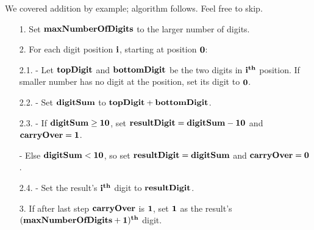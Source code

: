 \begin{frame}
We covered addition by example; algorithm follows. Feel free to skip.
\begin{algorithm}
\begin{itemize}
\item[1.] Set $\bf maxNumberOfDigits$ to the larger number of digits.
\item[2.] For each digit position $\bf{i}$, starting at position $\bf 0$:
\item[2.1.] - Let $\bf{topDigit}$ and $\bf{bottomDigit}$ be the two digits in $\bf{i}^{th}$ position. If smaller number has no digit at the position,  set its digit to $\bf 0$.
\item[2.2.] - Set $\bf{digitSum}$ to $\bf{topDigit} + \bf{bottomDigit}$.
\item[2.3.] 
- If $\bf{digitSum} \geq 10$, set $\bf{resultDigit}=\bf{digitSum} - 10$ and $\bf{carryOver} = 1$.

- Else  $\bf{digitSum} < 10$, so set $\bf{resultDigit}=\bf{digitSum}$ and $\bf{carryOver} = 0$.
\item[2.4.] - Set the result's $\bf i^{th}$ digit to $\bf {resultDigit}$.
\item[3.] If after last step $\bf carryOver$ is $\bf 1$, set $\bf 1$ as the result's $\bf (maxNumberOfDigits +1)^{th}$ digit.
\end{itemize}
\end{algorithm}
\end{frame}
